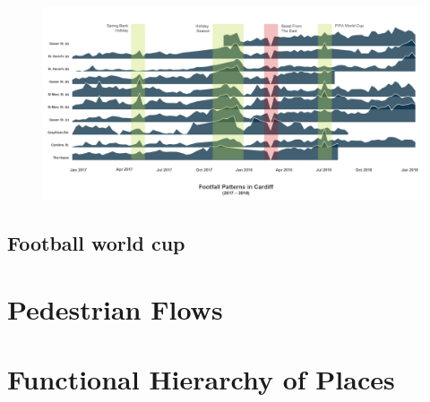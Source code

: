 \begin{figure}
  \forceversofloat
  \includegraphics[trim={0 50 0 0},clip]{images/applications-cardiff-footfall.png}
  \caption{}
  \label{}
\end{figure}

\lipsum[1]


\subsection{Football world cup}


\section{Pedestrian Flows}



\section{Functional Hierarchy of Places}

